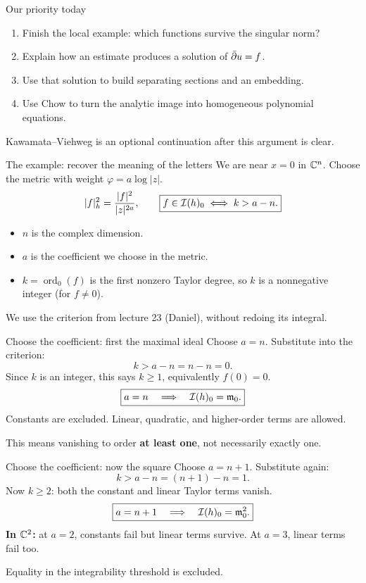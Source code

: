 \begin{frame}{Our priority today}
\begin{enumerate}
\setlength{\itemsep}{14pt}
\item Finish the local example: which functions survive the singular norm?
\item Explain how an estimate produces a solution of \(\bar\partial u=f\).
\item Use that solution to build separating sections and an embedding.
\item Use Chow to turn the analytic image into homogeneous polynomial equations.
\end{enumerate}
\par\medskip
Kawamata--Viehweg is an optional continuation after this argument is clear.
\end{frame}

\begin{frame}{The example: recover the meaning of the letters}
We are near \(x=0\) in \(\mathbb C^n\). Choose the metric with weight \(\varphi=a\log|z|\).
\[
|f|_h^2=\frac{|f|^2}{|z|^{2a}},\qquad
\boxed{f\in\mathcal I(h)_0\iff k>a-n.}
\]
\begin{itemize}
\setlength{\itemsep}{10pt}
\item \(n\) is the complex dimension.
\item \(a\) is the coefficient we choose in the metric.
\item \(k=\operatorname{ord}_0(f)\) is the first nonzero Taylor degree, so \(k\) is a nonnegative integer (for \(f\ne0\)).
\end{itemize}
We use the criterion from lecture 23 (Daniel), without redoing its integral.
\end{frame}

\begin{frame}{Choose the coefficient: first the maximal ideal}
Choose \(a=n\). Substitute into the criterion:
\[
k>a-n=n-n=0.
\]
Since \(k\) is an integer, this says \(k\ge1\), equivalently \(f(0)=0\).
\[
\boxed{a=n\quad\Longrightarrow\quad\mathcal I(h)_0=\mathfrak m_0.}
\]
Constants are excluded. Linear, quadratic, and higher-order terms are allowed.
\par\medskip
This means vanishing to order \textbf{at least one}, not necessarily exactly one.
\end{frame}

\begin{frame}{Choose the coefficient: now the square}
Choose \(a=n+1\). Substitute again:
\[
k>a-n=(n+1)-n=1.
\]
Now \(k\ge2\): both the constant and linear Taylor terms vanish.
\[
\boxed{a=n+1\quad\Longrightarrow\quad\mathcal I(h)_0=\mathfrak m_0^2.}
\]
\textbf{In \(\mathbb C^2\):} at \(a=2\), constants fail but linear terms survive. At \(a=3\), linear terms fail too.
\par\medskip
Equality in the integrability threshold is excluded.
\end{frame}



